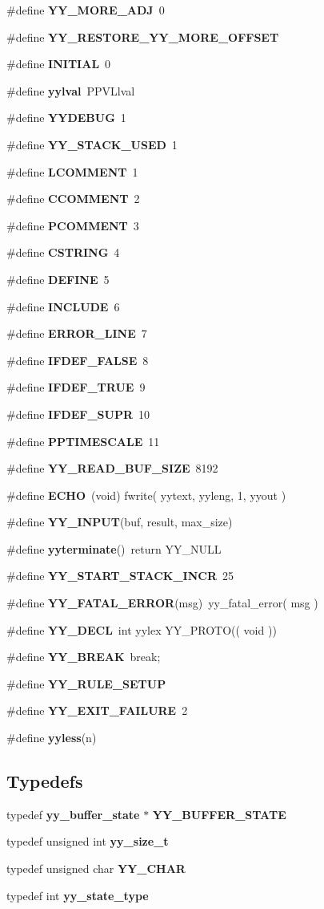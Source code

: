 \begin{CompactItemize}
\item 
\#define {\bf YY\_\-MORE\_\-ADJ}\ 0
\item 
\#define {\bf YY\_\-RESTORE\_\-YY\_\-MORE\_\-OFFSET}
\item 
\#define {\bf INITIAL}\ 0
\item 
\#define {\bf yylval}\ PPVLlval
\item 
\#define {\bf YYDEBUG}\ 1
\item 
\#define {\bf YY\_\-STACK\_\-USED}\ 1
\item 
\#define {\bf LCOMMENT}\ 1
\item 
\#define {\bf CCOMMENT}\ 2
\item 
\#define {\bf PCOMMENT}\ 3
\item 
\#define {\bf CSTRING}\ 4
\item 
\#define {\bf DEFINE}\ 5
\item 
\#define {\bf INCLUDE}\ 6
\item 
\#define {\bf ERROR\_\-LINE}\ 7
\item 
\#define {\bf IFDEF\_\-FALSE}\ 8
\item 
\#define {\bf IFDEF\_\-TRUE}\ 9
\item 
\#define {\bf IFDEF\_\-SUPR}\ 10
\item 
\#define {\bf PPTIMESCALE}\ 11
\item 
\#define {\bf YY\_\-READ\_\-BUF\_\-SIZE}\ 8192
\item 
\#define {\bf ECHO}\ (void) fwrite( yytext, yyleng, 1, yyout )
\item 
\#define {\bf YY\_\-INPUT}(buf, result, max\_\-size)
\item 
\#define {\bf yyterminate}()\ return YY\_\-NULL
\item 
\#define {\bf YY\_\-START\_\-STACK\_\-INCR}\ 25
\item 
\#define {\bf YY\_\-FATAL\_\-ERROR}(msg)\ yy\_\-fatal\_\-error( msg )
\item 
\#define {\bf YY\_\-DECL}\ int yylex YY\_\-PROTO(( void ))
\item 
\#define {\bf YY\_\-BREAK}\ break;
\item 
\#define {\bf YY\_\-RULE\_\-SETUP}
\item 
\#define {\bf YY\_\-EXIT\_\-FAILURE}\ 2
\item 
\#define {\bf yyless}(n)
\end{CompactItemize}
\subsection*{Typedefs}
\begin{CompactItemize}
\item 
typedef {\bf yy\_\-buffer\_\-state} $\ast$ {\bf YY\_\-BUFFER\_\-STATE}
\item 
typedef unsigned int {\bf yy\_\-size\_\-t}
\item 
typedef unsigned char {\bf YY\_\-CHAR}
\item 
typedef int {\bf yy\_\-state\_\-type}
\end{CompactItemize}
